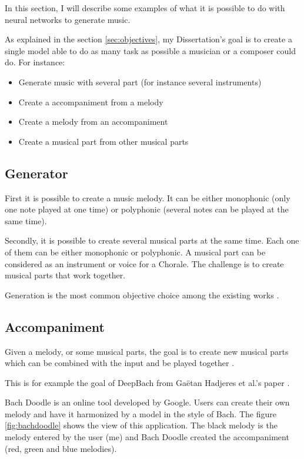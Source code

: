 \documentclass[12pt]{report}
\begin{document}
In this section, I will describe some examples of what it is possible to do with neural networks to generate music.

As explained in the section \ref{sec:objectives}, my Dissertation's goal is to create a single model able to do as many task as possible a musician or a composer could do.
For instance:
\begin{itemize}
    \item Generate music with several part (for instance several instruments)
    \item Create a accompaniment from a melody
    \item Create a melody from an accompaniment
    \item Create a musical part from other musical parts
\end{itemize}

\subsection{Generator}

First it is possible to create a music melody. It can be either monophonic (only one note played at one time) or polyphonic (several notes can be played at the same time).

Secondly, it is possible to create several musical parts at the same time. Each one of them can be either monophonic or polyphonic.
A musical part can be considered as an instrument or voice for a Chorale.
The challenge is to create musical parts that work together.

Generation is the most common objective choice among the existing works \cite{liang_automatic_2017, chuan_modeling_nodate, huang_counterpoint_2017, boulanger-lewandowski_modeling_2012, lattner_imposing_2018}.

\subsection{Accompaniment}

Given a melody, or some musical parts, the goal is to create new musical parts which can be combined with the input and be played together \cite{hadjeres_deepbach:_2016, huang_bach_2019}.

This is for example the goal of DeepBach from Gaëtan Hadjeres et al.'s paper \cite{hadjeres_deepbach:_2016}.

Bach Doodle \cite{huang_bach_2019} is an online tool developed by Google.
Users can create their own melody and have it harmonized by a model in the style of Bach.
The figure \ref{fig:bachdoodle} shows the view of this application.
The black melody is the melody entered by the user (me) and Bach Doodle created the accompaniment (red, green and blue melodies).
\end{document}
